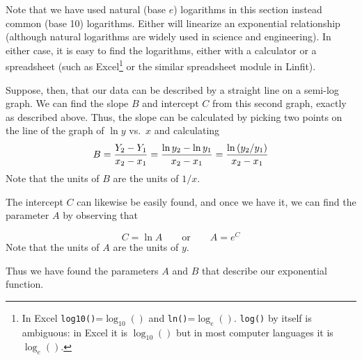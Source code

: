 Note that we have used natural (base $e$) logarithms in this section
instead common (base 10) logarithms.  Either will linearize an exponential
relationship
(although natural logarithms are widely used in science and engineering).
  In either case,
it is easy to find the logarithms, either with a calculator or a
spreadsheet (such as Excel\footnote{
In Excel {\tt log10()}=$\log_{10}()$ and {\tt ln()}=$\log_e()$.
 {\tt log()} by itself is ambiguous: in Excel it is $\log_{10}()$
but in most computer languages it is $\log_e()$.}
%
 or the similar spreadsheet module in
Linfit).

Suppose, then, that our data can be described by a straight line
on a semi-log graph.  We can find the slope $B$ and intercept $C$
from this second graph, exactly as described above.
Thus, the slope can be calculated by picking two points
on the line of the graph of $\ln y$ vs.\ $x$ and calculating
\begin{equation}
B = {{Y_{2} - Y_{1}} \over {x_{2} - x_{1}}} = {{\ln y_{2} - \ln y_{1}}
           \over {x_{2} - x_{1}}} = 
{\ln\left(y_{2}/y_{1}\right) \over x_{2} - x_{1}}  \label{eq:cnew}
\end{equation}
Note that the units of $B$ are the units of $1/x$.

The intercept $C$ can likewise be easily found, and once we have it,
we can find the parameter $A$ by observing that

%
\[
C = \ln A  \qquad \mbox{or} \qquad  A = e^{C}
\]
Note that the units of $A$ are the units of $y$.

Thus we have found the parameters $A$ and $B$ that describe our
exponential function.


